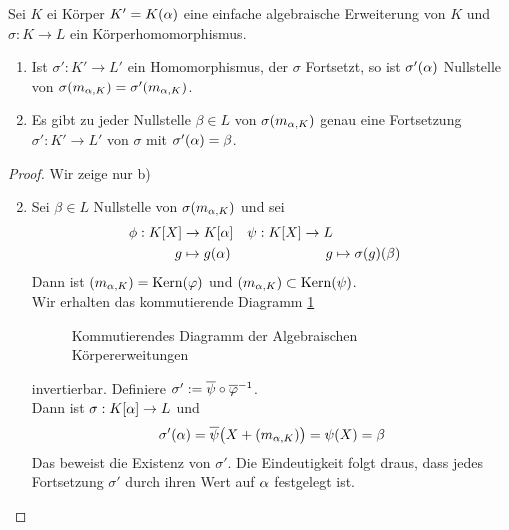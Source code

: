  	\begin{satz}\label{satz:nsterhaltung}
 		Sei $K$ ei Körper $K'=K(\alpha)$ eine einfache algebraische Erweiterung von $K$ und $\sigma:K\to L$ ein Körperhomomorphismus.
 		\begin{enumerate}
 			\item Ist $\sigma':K'\to L'$ ein Homomorphismus, der $\sigma$ Fortsetzt, so ist $\sigma'(\alpha)$ Nullstelle von $\sigma(m_{\alpha,K})=\sigma'(m_{\alpha,K})$.
 			\item Es gibt zu jeder Nullstelle $\beta\in L$ von $\sigma(m_{\alpha,K})$ genau eine Fortsetzung $\sigma':K'\to L'$ von $\sigma$ mit $\sigma'(\alpha)=\beta$.
 		\end{enumerate}
 	\end{satz}
 	\begin{proof}
 		Wir zeige nur b)
 		\begin{enumerate}
 			\setcounter{enumi}{1}
 			\item Sei $\beta\in L$ Nullstelle von $\sigma(m_{\alpha,K})$ und sei
 			\begin{align*}
 			\phi:K[X]&\to K[\alpha]&\psi:K[X]\to L\\
 			g&\mapsto g(\alpha)&g&\mapsto \sigma(g)(\beta)
 			\end{align*}
 			Dann ist $(m_{\alpha,K})=\operatorname{Kern}(\varphi)$ und $(m_{\alpha,K})\subset\operatorname{Kern}(\psi)$.\\
 			Wir erhalten das kommutierende Diagramm \ref{fig:cdiag-alg-einf-KE}
 			\begin{figure}
 				\centering
 			\caption{Kommutierendes Diagramm der Algebraischen Körpererweitungen}
 			\label{fig:cdiag-alg-einf-KE}
 			\end{figure}
 			invertierbar. Definiere $\sigma':=\overline{\psi}\circ\overline{\varphi}^{-1}$.\\
 			Dann ist $\sigma:K[\alpha]\to L$ und \[\sigma'(\alpha)=\overline{\psi}\big(X+(m_{\alpha,K})\big)=\psi(X)=\beta\]
 			Das beweist die Existenz von $\sigma'$. Die Eindeutigkeit folgt draus, dass jedes Fortsetzung $\sigma'$ durch ihren Wert auf $\alpha$ festgelegt ist.
 		\end{enumerate}
 	\end{proof}
 
